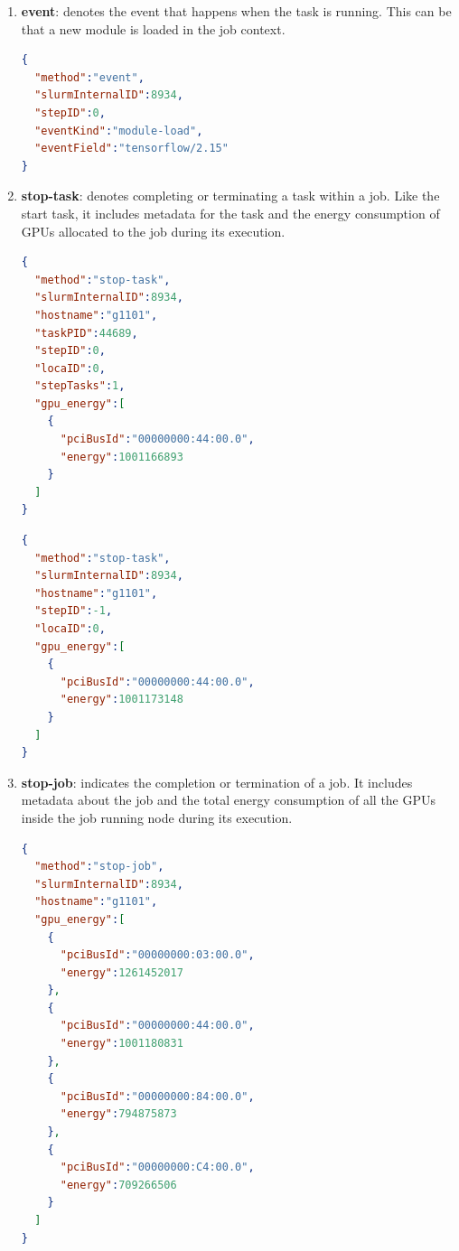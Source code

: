 \begin{enumerate}
    \item \textbf{event}: denotes the event that happens when the task is running. This can be that a new module is loaded in the job context.

\begin{lstlisting}[language=JSON]
{
  "method":"event",
  "slurmInternalID":8934,
  "stepID":0,
  "eventKind":"module-load",
  "eventField":"tensorflow/2.15"
}

\end{lstlisting}

    \item \textbf{stop-task}: denotes completing or terminating a task within a job. Like the start task, it includes metadata for the task and the energy consumption of GPUs allocated to the job during its execution.

\begin{lstlisting}[language=JSON]
{
  "method":"stop-task",
  "slurmInternalID":8934,
  "hostname":"g1101",
  "taskPID":44689,
  "stepID":0,
  "locaID":0,
  "stepTasks":1,
  "gpu_energy":[
    {
      "pciBusId":"00000000:44:00.0",
      "energy":1001166893
    }
  ]
}
\end{lstlisting}

\begin{lstlisting}[language=JSON]
{
  "method":"stop-task",
  "slurmInternalID":8934,
  "hostname":"g1101",
  "stepID":-1,
  "locaID":0,
  "gpu_energy":[
    {
      "pciBusId":"00000000:44:00.0",
      "energy":1001173148
    }
  ]
}
\end{lstlisting}

    \item \textbf{stop-job}: indicates the completion or termination of a job. It includes metadata about the job and the total energy consumption of all the GPUs inside the job running node during its execution.

\clearpage

\begin{lstlisting}[language=JSON]
{
  "method":"stop-job",
  "slurmInternalID":8934,
  "hostname":"g1101",
  "gpu_energy":[
    {
      "pciBusId":"00000000:03:00.0",
      "energy":1261452017
    },
    {
      "pciBusId":"00000000:44:00.0",
      "energy":1001180831
    },
    {
      "pciBusId":"00000000:84:00.0",
      "energy":794875873
    },
    {
      "pciBusId":"00000000:C4:00.0",
      "energy":709266506
    }
  ]
}
\end{lstlisting}

\end{enumerate}

